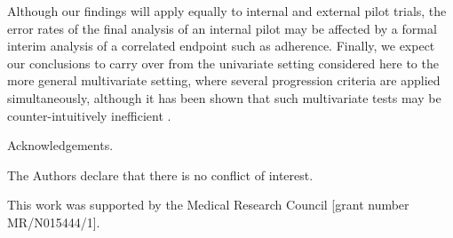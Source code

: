 \documentclass[sagev]{sagej}
\begin{document}
Although our findings will apply equally to internal and external pilot trials, the error rates of the final analysis of an internal pilot may be affected by a formal interim analysis of a correlated endpoint such as adherence. Finally, we expect our conclusions to carry over from the univariate setting considered here to the more general multivariate setting, where several progression criteria are applied simultaneously, although it has been shown that such multivariate tests may be counter-intuitively inefficient \cite{Wilson2021a}.

\begin{acks}
Acknowledgements.
\end{acks}

\begin{dci}
The Authors declare that there is no conflict of interest.
\end{dci}

\begin{funding}
This work was supported by the Medical Research Council [grant number MR/N015444/1].
\end{funding}



\end{document}
